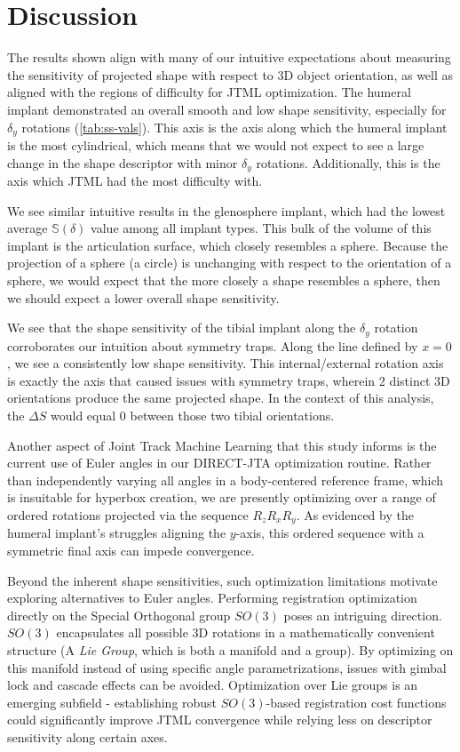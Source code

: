 \section{Discussion}
The results shown align with many of our intuitive expectations about measuring the sensitivity of projected shape with respect to 3D object orientation, as well as aligned with the regions of difficulty for JTML optimization.
The humeral implant demonstrated an overall smooth and low shape sensitivity, especially for $\delta_{y}$ rotations (\cref{tab:ss-vals}).
This axis is the axis along which the humeral implant is the most cylindrical, which means that we would not expect to see a large change in the shape descriptor with minor $\delta_{y}$ rotations.
Additionally, this is the axis which JTML had the most difficulty with.

We see similar intuitive results in the glenosphere implant, which had the lowest average $\mathbb{S}(\delta)$ value among all implant types.
This bulk of the volume of this implant is the articulation surface, which closely resembles a sphere.
Because the projection of a sphere (a circle) is unchanging with respect to the orientation of a sphere, we would expect that the more closely a shape resembles a sphere, then we should expect a lower overall shape sensitivity.

We see that the shape sensitivity of the tibial implant along the $\delta_{y}$ rotation corroborates our intuition about symmetry traps.
Along the line defined by $x=0$, we see a consistently low shape sensitivity.
This internal/external rotation axis is exactly the axis that caused issues with symmetry traps, wherein 2 distinct 3D orientations produce the same projected shape.
In the context of this analysis, the $\Delta S$ would equal $0$ between those two tibial orientations.

Another aspect of Joint Track Machine Learning that this study informs is the current use of Euler angles in our DIRECT-JTA optimization routine.
Rather than independently varying all angles in a body-centered reference frame, which is insuitable for hyperbox creation, we are presently optimizing over a range of ordered rotations projected via the sequence $R_{z}R_{x}R_{y}$.
As evidenced by the humeral implant's struggles aligning the $y$-axis, this ordered sequence with a symmetric final axis can impede convergence.

Beyond the inherent shape sensitivities, such optimization limitations motivate exploring alternatives to Euler angles.
Performing registration optimization directly on the Special Orthogonal group $SO(3)$ poses an intriguing direction.
$SO(3)$ encapsulates all possible 3D rotations in a mathematically convenient structure (A \emph{Lie Group}, which is both a manifold and a group).
By optimizing on this manifold instead of using specific angle parametrizations, issues with gimbal lock and cascade effects can be avoided.
Optimization over Lie groups is an emerging subfield - establishing robust $SO(3)$-based registration cost functions could significantly improve JTML convergence while relying less on descriptor sensitivity along certain axes.

